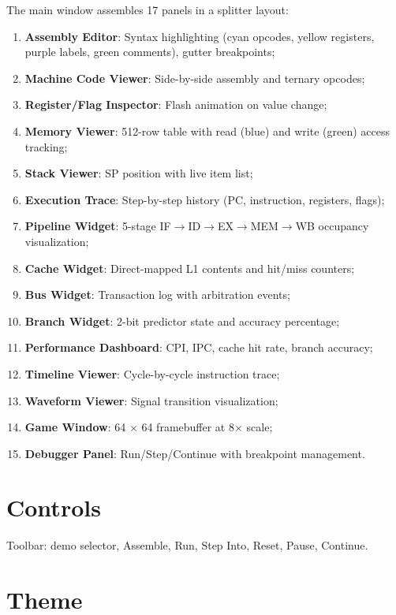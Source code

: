 \documentclass[12pt,a4paper,twoside]{book}
\theoremstyle{trinarytheorem}
\theoremstyle{trinarydefinition}
\begin{document}
The main window assembles 17 panels in a splitter layout:
\begin{enumerate}
    \item \textbf{Assembly Editor}: Syntax highlighting (cyan opcodes, yellow registers,
          purple labels, green comments), gutter breakpoints;
    \item \textbf{Machine Code Viewer}: Side-by-side assembly and ternary opcodes;
    \item \textbf{Register/Flag Inspector}: Flash animation on value change;
    \item \textbf{Memory Viewer}: 512-row table with read (blue) and write (green)
          access tracking;
    \item \textbf{Stack Viewer}: SP position with live item list;
    \item \textbf{Execution Trace}: Step-by-step history (PC, instruction, registers,
          flags);
    \item \textbf{Pipeline Widget}: 5-stage IF$\rightarrow$ID$\rightarrow$EX$\rightarrow$MEM$\rightarrow$WB
          occupancy visualization;
    \item \textbf{Cache Widget}: Direct-mapped L1 contents and hit/miss counters;
    \item \textbf{Bus Widget}: Transaction log with arbitration events;
    \item \textbf{Branch Widget}: 2-bit predictor state and accuracy percentage;
    \item \textbf{Performance Dashboard}: CPI, IPC, cache hit rate, branch accuracy;
    \item \textbf{Timeline Viewer}: Cycle-by-cycle instruction trace;
    \item \textbf{Waveform Viewer}: Signal transition visualization;
    \item \textbf{Game Window}: 64 $\times$ 64 framebuffer at 8$\times$ scale;
    \item \textbf{Debugger Panel}: Run/Step/Continue with breakpoint management.
\end{enumerate}

\section{Controls}

Toolbar: demo selector, Assemble, Run, Step Into, Reset, Pause, Continue.

\section{Theme}
\end{document}
